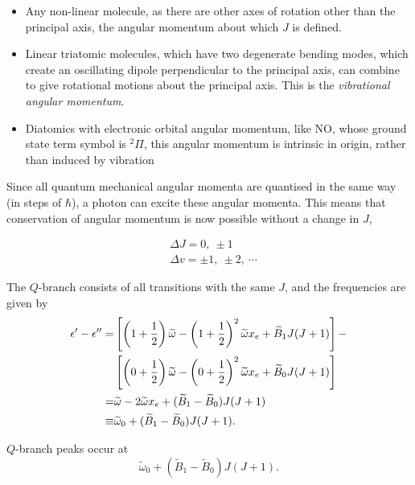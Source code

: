 \begin{itemize}
	\item Any non-linear molecule, as there are other axes of rotation other than the principal axis, the angular momentum about which $J$ is defined.
	\item Linear triatomic molecules, which have two degenerate bending modes, which create an oscillating dipole perpendicular to the principal axis, can combine to give rotational motions about the principal axis. This is the \textit{vibrational angular momentum}. 
	\item Diatomics with electronic orbital angular momentum, like NO, whose ground state term symbol is $^2\Pi$, this angular momentum is intrinsic in origin, rather than induced by vibration
\end{itemize}
Since all quantum mechanical angular momenta are quantised in the same way (in steps of $\hbar$), a photon can excite these angular momenta. This means that conservation of angular momentum is now possible without 
a change in $J$, 
\begin{prt}
\begin{equation}
\begin{aligned}
&\Delta J=0,\ \pm1\\
&\Delta v=\pm1,\ \pm2,\ \cdots
\end{aligned}
\end{equation}
\end{prt}
The $Q$-branch consists of all transitions with the same $J$, and the frequencies are given by 
\begin{equation}
\begin{aligned}
\epsilon'-\epsilon''=&\left[\left(1+\frac{1}{2}\right)\widetilde{\omega}-\left(1+\frac{1}{2}\right)^2\widetilde{\omega}x_e +\widetilde{B}_1J(J+1) \right]-\\
&\left[\left(0+\frac{1}{2}\right)\widetilde{\omega}-\left(0+\frac{1}{2}\right)^2\widetilde{\omega}x_e +\widetilde{B}_0J(J+1)\right]\\
=&\widetilde{\omega}-2\widetilde{\omega}x_e+(\widetilde{B}_1-\widetilde{B}_0)J(J+1)\\
\equiv&\widetilde{\omega}_0+(\widetilde{B}_1-\widetilde{B}_0)J(J+1).
\end{aligned}
\end{equation}
\begin{prt}
$Q$-branch peaks occur at
\begin{equation}
\widetilde{\omega}_0+(\widetilde{B}_1-\widetilde{B}_0)J(J+1).
\end{equation}
\end{prt}

